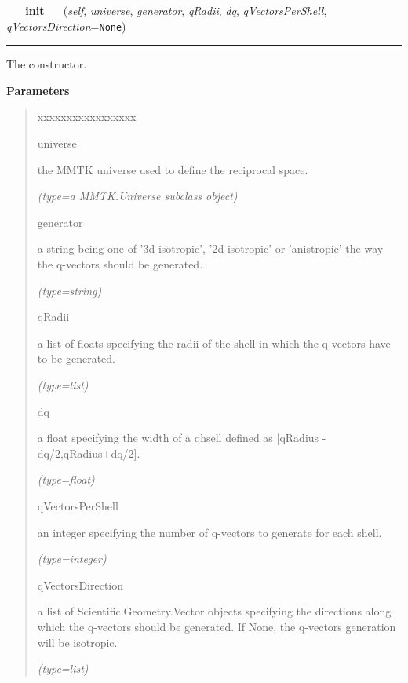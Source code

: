 \hspace{.8\funcindent}\begin{boxedminipage}{\funcwidth}

    \raggedright \textbf{\_\_init\_\_}(\textit{self}, \textit{universe}, \textit{generator}, \textit{qRadii}, \textit{dq}, \textit{qVectorsPerShell}, \textit{qVectorsDirection}={\tt None})

    \vspace{-1.5ex}

    \rule{\textwidth}{0.5\fboxrule}
\setlength{\parskip}{2ex}
    The constructor.

\setlength{\parskip}{1ex}
      \textbf{Parameters}
      \vspace{-1ex}

      \begin{quote}
        \begin{Ventry}{xxxxxxxxxxxxxxxxx}

          \item[universe]

          the MMTK universe used to define the reciprocal space.

            {\it (type=a MMTK.Universe subclass object)}

          \item[generator]

          a string being one of '3d isotropic', '2d isotropic' or 
          'anistropic' the way the q-vectors should be generated.

            {\it (type=string)}

          \item[qRadii]

          a list of floats specifying the radii of the shell in which the q
          vectors have to be generated.

            {\it (type=list)}

          \item[dq]

          a float specifying the width of a qhsell defined as 
          [{\textbar}qRadius{\textbar} - 
          dq/2,{\textbar}qRadius{\textbar}+dq/2].

            {\it (type=float)}

          \item[qVectorsPerShell]

          an integer specifying the number of q-vectors to generate for 
          each shell.

            {\it (type=integer)}

          \item[qVectorsDirection]

          a list of Scientific.Geometry.Vector objects specifying the 
          directions along which the q-vectors should be generated. If 
          None, the q-vectors generation will be isotropic.

            {\it (type=list)}

        \end{Ventry}

      \end{quote}

    \end{boxedminipage}

